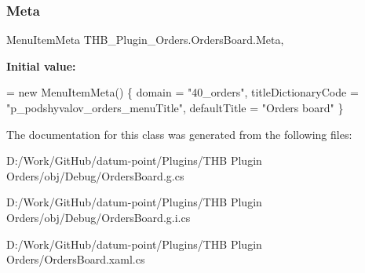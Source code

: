 \subsubsection{\texorpdfstring{Meta}{Meta}}
{\footnotesize\ttfamily Menu\+Item\+Meta T\+H\+B\+\_\+\+Plugin\+\_\+\+Orders.\+Orders\+Board.\+Meta\hspace{0.3cm}{\ttfamily [get]}, {\ttfamily [set]}}

{\bfseries Initial value\+:}
\begin{DoxyCode}
= \textcolor{keyword}{new} MenuItemMeta()
        \{
            domain = \textcolor{stringliteral}{"40\_orders"},
            titleDictionaryCode = \textcolor{stringliteral}{"p\_podshyvalov\_orders\_menuTitle"},
            defaultTitle = \textcolor{stringliteral}{"Orders board"}
        \}
\end{DoxyCode}


The documentation for this class was generated from the following files\+:\begin{DoxyCompactItemize}
\item 
D\+:/\+Work/\+Git\+Hub/datum-\/point/\+Plugins/\+T\+H\+B Plugin Orders/obj/\+Debug/Orders\+Board.\+g.\+cs\item 
D\+:/\+Work/\+Git\+Hub/datum-\/point/\+Plugins/\+T\+H\+B Plugin Orders/obj/\+Debug/Orders\+Board.\+g.\+i.\+cs\item 
D\+:/\+Work/\+Git\+Hub/datum-\/point/\+Plugins/\+T\+H\+B Plugin Orders/Orders\+Board.\+xaml.\+cs\end{DoxyCompactItemize}
